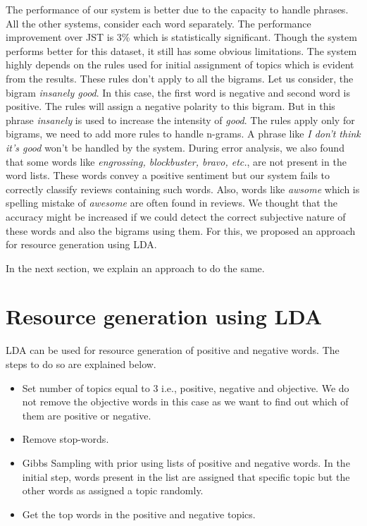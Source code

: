 The performance of our system is better due to the capacity to handle phrases. All the other systems, consider each word separately. The performance improvement over JST is
3\% which is statistically significant. Though the system performs better for this dataset, it still has some obvious limitations. The system highly depends on the rules 
used for initial assignment of topics which is evident from the results. These rules don't apply to all the bigrams. Let us consider, the bigram \textit{insanely good}. In
this case, the first word is negative and second word is positive. The rules will assign a negative polarity to this bigram. But in this phrase \textit{insanely} is used to
increase the intensity of \textit{good}. The rules apply only for bigrams, we need to add more rules to handle n-grams. A phrase like \textit{I don't think it's good} won't
be handled by the system. During error analysis, we also found that some words like \textit{engrossing, blockbuster, bravo, etc.}, are not present in the word lists. These 
words convey a positive sentiment but our system fails to correctly classify reviews containing such words. Also, words like \textit{awsome} which is spelling mistake of 
\textit{awesome} are often found in reviews. We thought that the accuracy might be increased if we could detect the correct subjective nature of these words and also the 
bigrams using them. For this, we proposed  an approach for resource generation using LDA.

In the next section, we explain an approach to do the same.

\section{Resource generation using LDA}

LDA can be used for resource generation of positive and negative words. The steps to do so are explained below.

\begin{itemize}
 \itemsep0em
 \item Set number of topics equal to 3 i.e., positive, negative and objective. We do not remove the objective
 words in this case as we want to find out which of them are positive or negative.
 \item Remove stop-words.
 \item Gibbs Sampling with prior using lists of positive and negative words. In the initial step, words present 
 in the list are assigned that specific topic but the other words as assigned a topic randomly.
 \item Get the top words in the positive and negative topics. 
\end{itemize}

